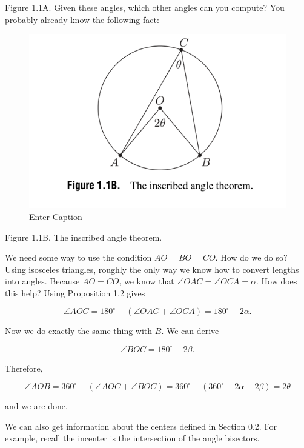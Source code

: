\documentclass{article}
\begin{document}
Figure 1.1A. Given these angles, which other angles can you compute? You probably already know the following fact:

\begin{figure}
    \centering
    \includegraphics[width=0.5\linewidth]{Image2.png}
    \caption{Enter Caption}
    \label{fig:enter-label}
\end{figure}


Figure 1.1B. The inscribed angle theorem.

We need some way to use the condition \( AO = BO = CO \). How do we do so? Using isosceles triangles, roughly the only way we know how to convert lengths into angles. Because \( AO = CO \), we know that \( \angle OAC = \angle OCA = \alpha \). How does this help? Using Proposition 1.2 gives

\[
\angle AOC = 180^\circ - (\angle OAC + \angle OCA) = 180^\circ - 2\alpha.
\]

Now we do exactly the same thing with \( B \). We can derive

\[
\angle BOC = 180^\circ - 2\beta.
\]

Therefore,

\[
\angle AOB = 360^\circ - (\angle AOC + \angle BOC) = 360^\circ - (360^\circ - 2\alpha - 2\beta) = 2\theta
\]

and we are done.

We can also get information about the centers defined in Section 0.2. For example, recall the incenter is the intersection of the angle bisectors.
\end{document}
